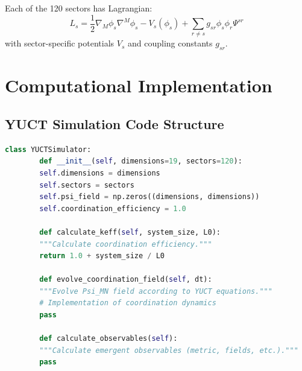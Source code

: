\documentclass[12pt,a4paper]{article}
\theoremstyle{remark}
\begin{document}
	Each of the 120 sectors has Lagrangian:
	\[
	L_s = \frac{1}{2} \nabla_M \phi_s \nabla^M \phi_s - V_s(\phi_s) + \sum_{r \neq s} g_{sr} \phi_s \phi_r \Psi^{sr}
	\]
	with sector-specific potentials $V_s$ and coupling constants $g_{sr}$.
	
	\section{Computational Implementation}
	\label{app:computational}
	
	\subsection{YUCT Simulation Code Structure}
	
	\begin{lstlisting}[language=Python, caption={YUCT Simulation Framework}, label={lst:simulation}]
		class YUCTSimulator:
		def __init__(self, dimensions=19, sectors=120):
		self.dimensions = dimensions
		self.sectors = sectors
		self.psi_field = np.zeros((dimensions, dimensions))
		self.coordination_efficiency = 1.0
		
		def calculate_keff(self, system_size, L0):
		"""Calculate coordination efficiency."""
		return 1.0 + system_size / L0
		
		def evolve_coordination_field(self, dt):
		"""Evolve Psi_MN field according to YUCT equations."""
		# Implementation of coordination dynamics
		pass
		
		def calculate_observables(self):
		"""Calculate emergent observables (metric, fields, etc.)."""
		pass
	\end{lstlisting}
	
\end{document}
